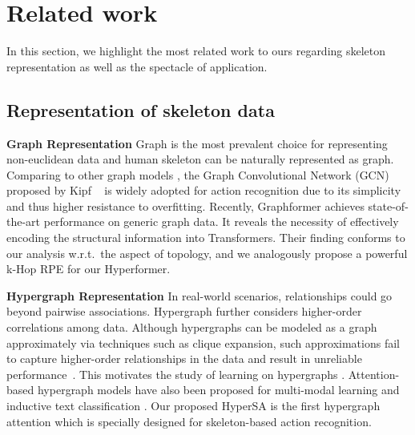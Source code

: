 \documentclass[10pt,twocolumn,letterpaper]{article}
\begin{document}

\section{Related work}
In this section, we highlight the most related work to ours regarding skeleton representation as well as the spectacle of application.

\subsection{Representation of skeleton data}
\noindent \textbf{Graph Representation} Graph is the most prevalent choice for representing non-euclidean data and human skeleton can be naturally represented as graph. 
Comparing to other graph models \cite{xu2018how, gilmer2017neural, velivckovic2017graph}, the Graph Convolutional Network (GCN) proposed by Kipf \etal~\cite{kipf2016semi} is widely adopted for action recognition due to its simplicity and thus higher resistance to overfitting.
Recently, Graphformer \cite{ying2021transformers} achieves state-of-the-art performance on generic graph data. It reveals the necessity of effectively encoding
the structural information into Transformers. Their finding conforms to our analysis w.r.t.~the aspect of topology, and we analogously propose a powerful k-Hop RPE for our Hyperformer.   

\noindent \textbf{Hypergraph Representation} In real-world scenarios,
relationships could go beyond pairwise associations. Hypergraph further considers higher-order correlations among data. Although hypergraphs can be modeled as
a graph approximately via techniques such as clique expansion\cite{zhou2006learning}, such approximations fail to capture higher-order relationships in the data and result
in unreliable performance~\cite{chien2019hs, li2017inhomogeneous}.
This motivates
the study of learning on hypergraphs \cite{hein2013total, zhang2017re, feng2019hypergraph, yadati2019hypergcn}. Attention-based hypergraph models have also been proposed for multi-modal learning \cite{kim2020hypergraph} and inductive text classification \cite{ding2020more}. Our proposed HyperSA is the first hypergraph attention which is specially designed for skeleton-based action recognition.
\end{document}
